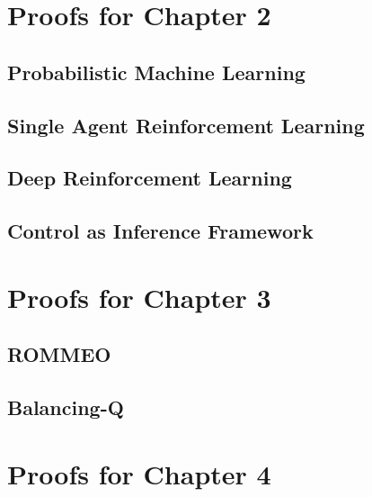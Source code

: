\documentclass{report}
\begin{document}
\appendix

% 



\chapter{Proofs for Chapter 2}

\section {Probabilistic Machine Learning}


\section {Single Agent Reinforcement Learning}


\section {Deep Reinforcement Learning}


\section {Control as Inference Framework}


\chapter{Proofs for Chapter 3}

\section {ROMMEO}


\section {Balancing-Q}


\chapter{Proofs for Chapter 4}




% 
\end{document}
